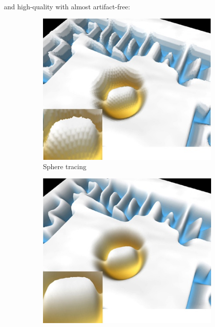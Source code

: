 and high-quality with almost artifact-free:

\begin{figure}
\begin{center}
	\begin{subfigure}[b]{0.18\textwidth}
		\includegraphics[width=1.0\textwidth]{graphics/df/ddm-shpere-tracing}	
		\caption{Sphere tracing}
	\end{subfigure}
	\begin{subfigure}[b]{0.1758\textwidth}
		\includegraphics[width=1.0\textwidth]{graphics/df/ddm-quadric-approx}	

\end{subfigure}
\end{center}
\end{figure}
